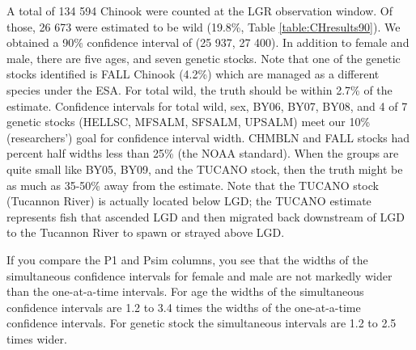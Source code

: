 \documentclass[%
                leqno,         %
%
]{nrc1}                          %
\begin{document}
A total of 134 594 Chinook were counted at the LGR observation window. Of those, 26 673 were estimated to be wild (19.8\%, Table \ref{table:CHresults90}). We obtained a 90\% confidence interval of (25 937, 27 400). In addition to female and male, there are five ages, and seven genetic stocks. Note that one of the genetic stocks identified is FALL Chinook (4.2\%) which are managed as a different species under the ESA. For total wild, the truth should be within 2.7\% of the estimate.  Confidence intervals for total wild, sex, BY06, BY07, BY08, and 4 of 7 genetic stocks (HELLSC, MFSALM, SFSALM, UPSALM) meet our 10\% (researchers') goal for confidence interval width. CHMBLN and FALL stocks had percent half widths less than 25\% (the NOAA standard). When the groups are quite small like BY05, BY09, and the TUCANO stock, then the truth might be as much as 35-50\% away from the estimate. Note that the TUCANO stock (Tucannon River) is actually located below LGD; the TUCANO estimate represents fish that ascended LGD and then migrated back downstream of LGD to the Tucannon River to spawn or strayed above LGD. 

If you compare the P1 and Psim columns, you see that the widths of the simultaneous confidence intervals for female and male are not markedly wider than the one-at-a-time intervals. For age the widths of the simultaneous confidence intervals are 1.2 to 3.4 times the widths of the one-at-a-time confidence intervals. For genetic stock the simultaneous intervals are 1.2 to 2.5 times wider.
\end{document}
